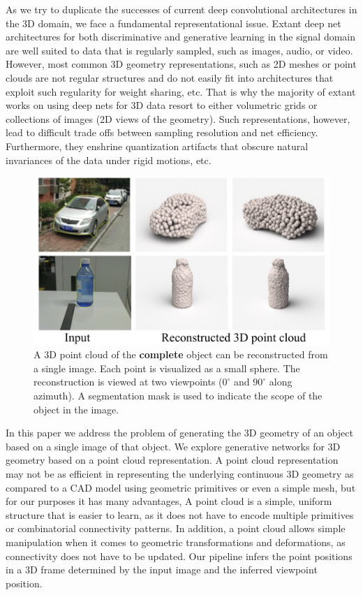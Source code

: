 \label{sec:intro}



As we try to duplicate the successes of current deep convolutional architectures in the 3D domain, we face a fundamental representational issue. Extant deep net architectures for both discriminative and generative learning in the signal domain are well suited to data that is regularly sampled, such as images, audio, or video. However, most common 3D geometry representations, such as 2D meshes or point clouds are not regular structures and do not easily fit into architectures that exploit such regularity for weight sharing, etc.  That is why the majority of extant works on using deep nets for 3D data resort to either volumetric grids or collections of images (2D views of the geometry). Such representations, however, lead to difficult trade offs between sampling resolution and net efficiency. Furthermore, they enshrine quantization artifacts that obscure natural invariances of the data under rigid motions, etc.
\begin{figure}[t!]
	\centering
	\includegraphics[width=\linewidth]{./fig/realworld2.pdf}
	\caption{A 3D point cloud of the {\bf complete} object can be reconstructed from a single image. Each point is visualized as a small sphere. The reconstruction is viewed at two viewpoints ($0^{\circ}$ and $90^{\circ}$ along azimuth). A segmentation mask is used to indicate the scope of the object in the image.}
	\label{fig:teaser}
	\vspace{-1em}
\end{figure}

In this paper we address the problem of generating the 3D geometry of an object based on a single image of that object. We explore generative networks for 3D geometry based on a point cloud representation. A point cloud representation may not be as efficient in representing the underlying continuous 3D geometry as compared to a CAD model using geometric primitives or even a simple mesh, but for our purposes it has many advantages, A point cloud is a simple, uniform structure that is easier to learn, as it does not have to encode multiple primitives or combinatorial connectivity patterns. In addition, a point cloud allows simple manipulation when it comes to geometric transformations and deformations, as connectivity does not have to be updated. Our pipeline infers the point positions in a 3D frame determined by the input image and the inferred viewpoint position.



